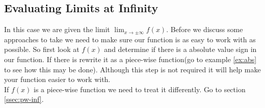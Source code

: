 \documentclass[12pt]{article}
\begin{document}
\subsection{Evaluating Limits at Infinity}
\label{ssec:inf}
In this case we are given the limit $\displaystyle{\lim_{x\to \pm\infty}f(x)}$. Before we discuss some approaches to take we need to make sure our function is as easy to work with as possible. So first look at $f(x)$ and determine if there is a absolute value sign in our function. If there is rewrite it as a piece-wise function(go to example \ref{ex:abs} to see how this may be done). Although this step is not required it will help make your function easier to work with.\\

If $f(x)$ is a piece-wise function we need to treat it differently. Go to section \ref{ssec:pw-inf}.
\end{document}
